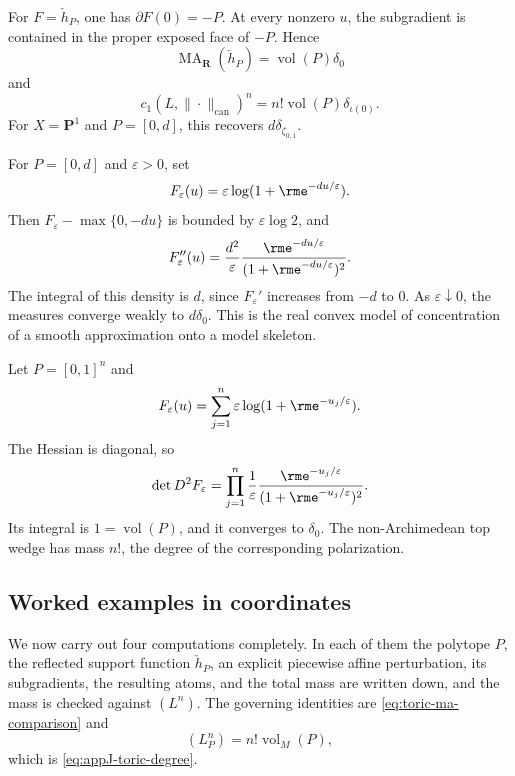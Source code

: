 \begin{example}
\label{ex:ch08-support-metric}
For $F=\check h_P$, one has $\partial F(0)=-P$.  At every nonzero $u$, the
subgradient is contained in the proper exposed face of
$-P$.  Hence
\[
              \operatorname{MA}_{\mathbf R}(\check h_P)
              =\operatorname{vol}(P)\delta_0
\]
and
\[
              c_1(L,\|\cdot\|_{\mathrm{can}})^n
              =n!\operatorname{vol}(P)\delta_{\iota(0)}.
\]
For $X=\mathbf P^1$ and $P=[0,d]$, this recovers
$d\delta_{\zeta_{0,1}}$.
\end{example}

\begin{example}
\label{ex:ch08-smooth-toric-line}
For $P=[0,d]$ and $\varepsilon>0$, set
\[
                  F_\varepsilon(u)
                  =\varepsilon\log(1+\rme^{-du/\varepsilon}).
\]
Then $F_\varepsilon-\max\{0,-du\}$ is bounded by
$\varepsilon\log2$, and
\[
 F_\varepsilon''(u)
 =\frac{d^2}{\varepsilon}
   \frac{\rme^{-du/\varepsilon}}{(1+\rme^{-du/\varepsilon})^2}.
\]
The integral of this density is $d$, since
$F_\varepsilon'$ increases from $-d$ to $0$.  As
$\varepsilon\downarrow0$, the measures converge weakly to $d\delta_0$.
This is the real convex model of concentration of a smooth approximation
onto a model skeleton.
\end{example}

\begin{example}
\label{ex:ch08-toric-cube}
Let $P=[0,1]^n$ and
\[
             F_\varepsilon(u)
             =\sum_{j=1}^n\varepsilon\log(1+\rme^{-u_j/\varepsilon}).
\]
The Hessian is diagonal, so
\[
 \det D^2F_\varepsilon
 =\prod_{j=1}^n
   \frac{1}{\varepsilon}
   \frac{\rme^{-u_j/\varepsilon}}{(1+\rme^{-u_j/\varepsilon})^2}.
\]
Its integral is $1=\operatorname{vol}(P)$, and it converges to $\delta_0$.
The non-Archimedean top wedge has mass $n!$, the degree of the corresponding
polarization.
\end{example}

\subsection{Worked examples in coordinates}
\label{sec:ch08-toric-worked}

We now carry out four computations completely.  In each of them the polytope
$P$, the reflected support function $\check h_P$, an explicit piecewise
affine perturbation, its subgradients, the resulting atoms, and the total
mass are written down, and the mass is checked against $(L^n)$.  The
governing identities are \eqref{eq:toric-ma-comparison} and
\[
 (L_P^n)=n!\operatorname{vol}_M(P),
\]
which is \eqref{eq:appJ-toric-degree}.

